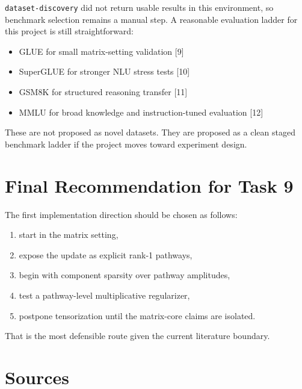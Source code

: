 \documentclass[11pt]{article}
\begin{document}
\texttt{dataset-discovery} did not return usable results in this environment, so benchmark selection remains a manual step. A reasonable evaluation ladder for this project is still straightforward:

\begin{itemize}
\item GLUE for small matrix-setting validation [9]
\item SuperGLUE for stronger NLU stress tests [10]
\item GSM8K for structured reasoning transfer [11]
\item MMLU for broad knowledge and instruction-tuned evaluation [12]
\end{itemize}

These are not proposed as novel datasets. They are proposed as a clean staged benchmark ladder if the project moves toward experiment design.

\section{Final Recommendation for Task 9}

The first implementation direction should be chosen as follows:

\begin{enumerate}
\item start in the matrix setting,
\item expose the update as explicit rank-1 pathways,
\item begin with component sparsity over pathway amplitudes,
\item test a pathway-level multiplicative regularizer,
\item postpone tensorization until the matrix-core claims are isolated.
\end{enumerate}

That is the most defensible route given the current literature boundary.

\section{Sources}
\end{document}
